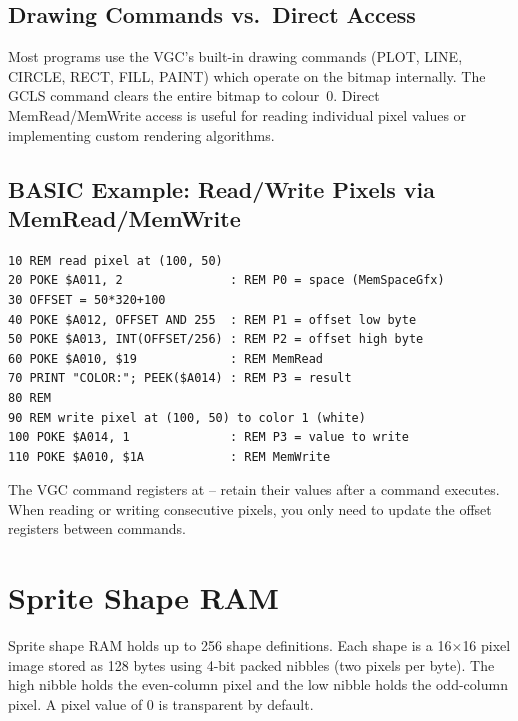 \subsection{Drawing Commands vs.\ Direct Access}

Most programs use the VGC's built-in drawing commands (PLOT, LINE, CIRCLE, RECT,
FILL, PAINT) which operate on the bitmap internally.  The GCLS command clears
the entire bitmap to colour~0.  Direct MemRead/MemWrite access is useful for
reading individual pixel values or implementing custom rendering algorithms.

\subsection{BASIC Example: Read/Write Pixels via MemRead/MemWrite}

\begin{lstlisting}
10 REM read pixel at (100, 50)
20 POKE $A011, 2               : REM P0 = space (MemSpaceGfx)
30 OFFSET = 50*320+100
40 POKE $A012, OFFSET AND 255  : REM P1 = offset low byte
50 POKE $A013, INT(OFFSET/256) : REM P2 = offset high byte
60 POKE $A010, $19             : REM MemRead
70 PRINT "COLOR:"; PEEK($A014) : REM P3 = result
80 REM
90 REM write pixel at (100, 50) to color 1 (white)
100 POKE $A014, 1              : REM P3 = value to write
110 POKE $A010, $1A            : REM MemWrite
\end{lstlisting}

\begin{notebox}
The VGC command registers at -- retain their values after
a command executes.  When reading or writing consecutive pixels, you only need to
update the offset registers between commands.
\end{notebox}


\section{Sprite Shape RAM}
\label{sec:sprite-shapes}

Sprite shape RAM holds up to 256 shape definitions.  Each shape is a
16$\times$16 pixel image stored as 128 bytes using 4-bit packed nibbles (two
pixels per byte).  The high nibble holds the even-column pixel and the low
nibble holds the odd-column pixel.  A pixel value of 0 is transparent by
default.

